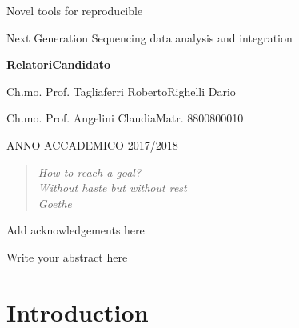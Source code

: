 \documentclass[b5paper,oneside,british,intoc,bibliograph=totoc,index=totoc,BCOR10mm,twoside,openright]{book}
\numberwithin{equation}{section}
\numberwithin{figure}{section}
\begin{document}
\vspace{1.5cm}

\begin{center}
Novel tools for reproducible 

Next Generation Sequencing data analysis and integration
\par\end{center}

\vspace{1.5cm}

\textbf{\large{}Relatori}\hfill{}\textbf{\large{}Candidato}{\large \par}

Ch.mo. Prof. Tagliaferri Roberto\hfill{}Righelli Dario

Ch.mo. Prof. Angelini Claudia\hfill{}Matr. 8800800010

\vspace{1.5cm}

\begin{center}
ANNO ACCADEMICO 2017/2018
\par\end{center}

\cleardoublepage

\begin{quotation}
\begin{flushright}
\textit{
How to reach a goal? \\
Without haste but without rest\\
Goethe}
\par\end{flushright}
\end{quotation}


\cleardoublepage
{}

Add acknowledgements here
%

\cleardoublepage


Write your abstract here


\hypersetup{hidelinks} %

\pagestyle{plain}\tableofcontents

\cleardoublepage{}
\pagestyle{fancy}


%
\newpage
\chapter{Introduction}

\end{document}
